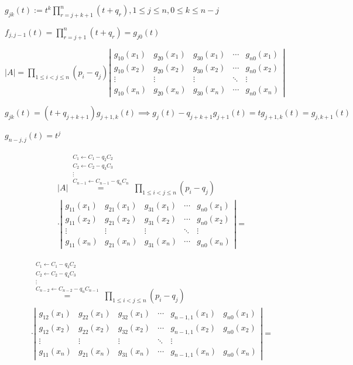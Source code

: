 \documentclass{article}
\begin{document}
\( g_{jk}(t) := t^{k}\prod_{r=j+k+1}^{n} (t+q_{r}), 1 \leq j \leq n, 0 \leq k \leq n - j \)

\( f_{j,j-1}(t) = \prod_{r=j+1}^{n}(t+q_{r}) = g_{j0}(t) \)

\( |A| = \prod_{1 \leq i < j \leq n} (p_{i} - q_{j}) \left|\begin{matrix}g_{10}(x_{1}) & g_{20}(x_{1}) & g_{30}(x_{1}) & \cdots & g_{n0}(x_{1}) \\ g_{10}(x_{2}) & g_{20}(x_{2}) & g_{30}(x_{2}) & \cdots & g_{n0}(x_{2}) \\ \vdots & \vdots & \vdots & \ddots & \vdots \\ g_{10}(x_{n}) & g_{20}(x_{n}) & g_{30}(x_{n}) & \cdots & g_{n0}(x_{n}) \end{matrix}\right| \)

\( g_{jk}(t) = (t + q_{j+k+1})g_{j+1,k}(t) \implies g_{j}(t) - q_{j+k+1}g_{j+1}(t) = tg_{j+1,k}(t) = g_{j, k + 1}(t) \)

\( g_{n-j,j}(t) = t^{j} \)

\begin{multline*}
|A| \overset{\substack{C_{1} \leftarrow C_{1} - q_{2}C_{2} \\ C_{2} \leftarrow C_{2} - q_{3}C_{3} \\ \vdots \\ C_{n-1} \leftarrow C_{n-1} - q_{n}C_{n} }}{=} \prod_{1 \leq i < j \leq n} (p_{i} - q_{j}) \\
\cdot \left|\begin{matrix}g_{11}(x_{1}) & g_{21}(x_{1}) & g_{31}(x_{1}) & \cdots & g_{n0}(x_{1}) \\ g_{11}(x_{2}) & g_{21}(x_{2}) & g_{31}(x_{2}) & \cdots & g_{n0}(x_{2}) \\ \vdots & \vdots & \vdots & \ddots & \vdots \\ g_{11}(x_{n}) & g_{21}(x_{n}) & g_{31}(x_{n}) & \cdots & g_{n0}(x_{n}) \end{matrix}\right| =
\end{multline*}

\begin{multline*}
\overset{\substack{C_{1} \leftarrow C_{1} - q_{3}C_{2} \\ C_{2} \leftarrow C_{2} - q_{4}C_{3} \\ \vdots \\ C_{n-2} \leftarrow C_{n-2} - q_{n}C_{n-1} }}{=} \prod_{1 \leq i < j \leq n} (p_{i} - q_{j}) \\
\cdot \left|\begin{matrix}g_{12}(x_{1}) & g_{22}(x_{1}) & g_{32}(x_{1}) & \cdots & g_{n-1,1}(x_{1}) & g_{n0}(x_{1}) \\ g_{12}(x_{2}) & g_{22}(x_{2}) & g_{32}(x_{2}) & \cdots & g_{n-1,1}(x_{2}) & g_{n0}(x_{2}) \\ \vdots & \vdots & \vdots & \ddots & \vdots \\ g_{11}(x_{n}) & g_{21}(x_{n}) & g_{31}(x_{n}) & \cdots & g_{n-1,1}(x_{n}) & g_{n0}(x_{n}) \end{matrix}\right| =
\end{multline*}
\end{document}
